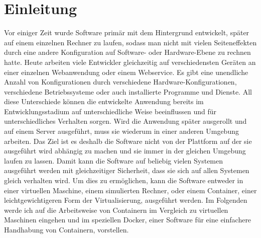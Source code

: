 \chapter{Einleitung}

Vor einiger Zeit wurde Software primär mit dem Hintergrund entwickelt, später auf einem einzelnen Rechner zu laufen, sodass man nicht mit vielen Seiteneffekten durch eine andere Konfiguration auf Software- oder Hardware-Ebene zu rechnen hatte. Heute arbeiten viele Entwickler gleichzeitig auf verschiedensten Geräten an einer einzelnen Webanwendung oder einem Webservice. Es gibt eine unendliche Anzahl von Konfigurationen durch verschiedene Hardware-Konfigurationen, verschiedene Betriebssysteme oder auch installierte Programme und Dienste. All diese Unterschiede können die entwickelte Anwendung bereits im Entwicklungsstadium auf unterschiedliche Weise beeinflussen und für unterschiedliches Verhalten sorgen. Wird die Anwendung später ausgerollt und auf einem Server ausgeführt, muss sie wiederum in einer anderen Umgebung arbeiten. Das Ziel ist es deshalb die Software nicht von der Plattform auf der sie ausgeführt wird abhängig zu machen und sie immer in der gleichen Umgebung laufen zu lassen. Damit kann die Software auf beliebig vielen Systemen ausgeführt werden mit gleichzeitiger Sicherheit, dass sie sich auf allen Systemen gleich verhalten wird. Um dies zu ermöglichen, kann die Software entweder in einer virtuellen Maschine, einem simulierten Rechner, oder einem Container, einer leichtgewichtigeren Form der Virtualisierung, ausgeführt werden. Im Folgenden werde ich auf die Arbeitsweise von Containern im Vergleich zu virtuellen Maschinen eingehen und im speziellen Docker, einer Software für eine einfachere Handhabung von Containern, vorstellen.
